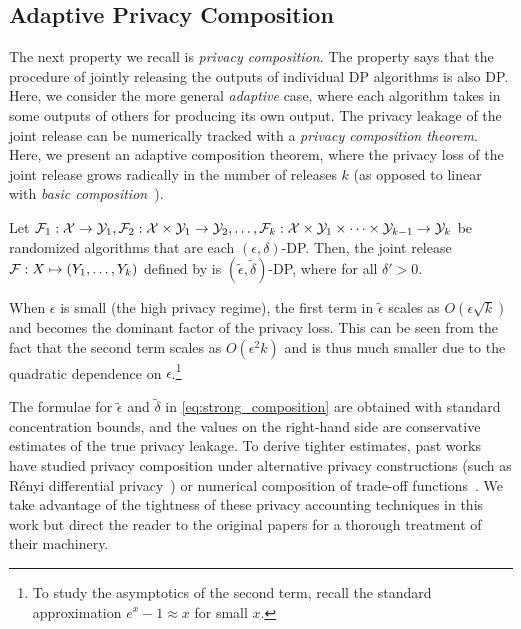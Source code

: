 \subsection{Adaptive Privacy Composition}
The next property we recall is \emph{privacy composition}.
The property says that the procedure of jointly releasing the outputs of individual DP algorithms is also DP.
Here, we consider the more general \emph{adaptive} case, where each algorithm takes in some outputs of others for producing its own output.
The privacy leakage of the joint release can be numerically tracked with a \emph{privacy composition theorem}.
Here, we present an adaptive composition theorem, where the privacy loss of the joint release grows radically in the number of releases $k$ (as opposed to linear with \emph{basic composition}~\citep{dwork2014algorithmic}).
\begin{theo}
Let $\mathcal{F}_1: \mathcal{X} \to \mathcal{Y}_1, \mathcal{F}_2: \mathcal{X} \times \mathcal{Y}_1 \to \mathcal{Y}_2, \dots, \mathcal{F}_k: \mathcal{X} \times \mathcal{Y}_1 \times \cdots \times \mathcal{Y}_{k-1} \to \mathcal{Y}_k$ be randomized algorithms that are each $(\epsilon, \delta)$-DP.
Then, the joint release $\mathcal{F}: X \mapsto \left( Y_1, \dots, Y_k \right)$ defined by  
is $(\widetilde{\epsilon}, \widetilde{\delta})$-DP, where
for all $\delta' > 0$.
\end{theo}
When $\epsilon$ is small (the high privacy regime), the first term in $\widetilde{\epsilon}$ scales as $O(\epsilon \sqrt{k})$ and becomes the dominant factor of the privacy loss. 
This can be seen from the fact that the second term scales as $O(\epsilon^2 k)$ and is thus much smaller due to the quadratic dependence on $\epsilon$.\footnote{To study the asymptotics of the second term, recall the standard approximation $e^x - 1 \approx x$ for small $x$.}

The formulae for $\widetilde{\epsilon}$ and $\widetilde{\delta}$ in \eqref{eq:strong_composition} are obtained with standard concentration bounds, and the values on the right-hand side are conservative estimates of the true privacy leakage.
To derive tighter estimates, past works have studied privacy composition under alternative privacy constructions (such as R\'enyi differential privacy~\citep{mironov2017renyi}) or numerical composition of trade-off functions~\citep{dong2019gaussian,gopi2021numerical,zhu2022optimal}.
We take advantage of the tightness of these privacy accounting techniques in this work but direct the reader to the original papers for a thorough treatment of their machinery.

